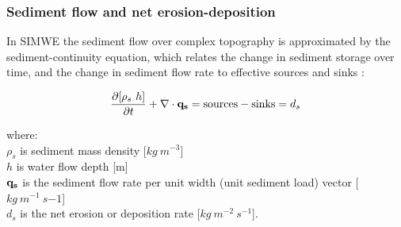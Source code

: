 \documentclass[gmd, manuscript]{copernicus}
\begin{document}

\subsubsection{Sediment flow and net erosion-deposition}

In SIMWE the sediment flow over complex topography is approximated 
by the sediment-continuity equation,
which relates the change in sediment storage over time, and the change
in sediment flow rate to effective sources and sinks \citep{haan1994,govindar1991,foster1972}: 

\begin{equation}
\label{eq:sedcont}
{\partial [\rho_s~h] \over \partial t} +
\nabla\cdot {\bf q_s} = {\rm sources - sinks}=
d_s
\end{equation}
\noindent

{\small
\noindent
where: \\
\noindent
\hspace*{0.5em} $\rho_s$ is sediment mass density [$\unit{kg~m^{-3}}$]\\
\hspace*{0.5em} $h$ is water flow depth  [\unit{m}]\\
\hspace*{0.5em} ${\bf q_s}$ is the sediment flow rate per unit width (unit sediment load) vector [$\unit{kg~m^{-1}~s{-1}}$]\\
\hspace*{0.5em} $d_s$ is the net erosion or deposition rate [$\unit{kg~m^{-2}~s^{-1}}$].
}

%
\end{document}
